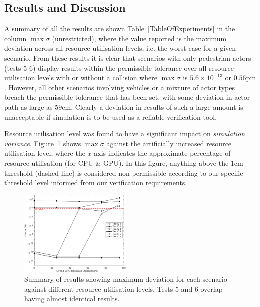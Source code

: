 \documentclass[letterpaper, 10 pt, journal, twoside]{IEEEtran}
\begin{document}
\subsection{Results and Discussion}\label{ResultsSection}
A summary of all the results are shown Table~\ref{TableOfExperiments} in the column $\max\sigma$ (unrestricted), where the value reported is the maximum deviation across all resource utilisation levels, i.e. the worst case for a given scenario.  
%
From these  results it is clear that scenarios with only pedestrian actors (tests 5-6) display results within the permissible tolerance over all resource utilisation levels with or without a collision where $\max\sigma$ is $5.6\times10^{-13}$ or $0.56\si{\pico\metre}$. However, all other scenarios involving vehicles or a mixture of actor types breach the permissible tolerance that has been set, with some deviation in actor path as large as $59$cm.
%
Clearly a deviation in results of such a large amount is unacceptable if simulation is to be used as a reliable verification tool.

Resource utilisation level was found to have a significant impact on \textit{simulation variance}.
%
Figure~\ref{ExperimentsStressSummary} shows $\max\sigma$ against the artificially increased resource utilisation level, where the $x$-axis indicates the approximate percentage of resource utilisation (for CPU \& GPU). In this figure, anything above the $1$cm threshold (dashed line) is considered non-permissible according to our specific threshold level informed from our verification requirements.
%
%

\begin{figure}[!t]
    \centering
    \includegraphics[width=0.48\textwidth]{Other/Figures/ExperimentsStressSummaryV4.pdf}
    \caption{Summary of results showing maximum deviation for each scenario against different resource utilisation levels. Tests 5 and 6 overlap having almost identical results.}
    \label{ExperimentsStressSummary}
\end{figure}
\end{document}
